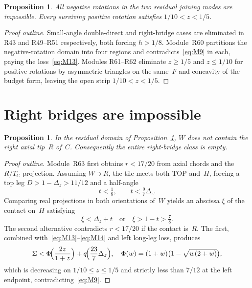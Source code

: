 \documentclass[11pt,reqno]{amsart}
\newtheorem{proposition}[theorem]{Proposition}
\theoremstyle{definition}
\newcommand{\TOP}{\mathrm{TOP}}
\begin{document}
\begin{proposition}\label{prop:M92}
All negative rotations in the two residual joining modes are impossible.
Every surviving positive rotation satisfies $1/10<z<1/5$.
\end{proposition}

\begin{proof}[Proof outline]
Small-angle double-direct and right-bridge cases are eliminated in R43 and
R49--R51 respectively, both forcing $h>1/8$.  Module~R60 partitions the
negative-rotation domain into four regions and contradicts~\eqref{eq:M9} in
each, paying the loss~\eqref{eq:M13}.  Modules R61--R62 eliminate
$z\ge 1/5$ and $z\le 1/10$ for positive rotations by asymmetric triangles on
the same~$F$ and concavity of the budget form, leaving the open strip
$1/10<z<1/5$.
\end{proof}

\section{Right bridges are impossible}\label{sec:M10}

\begin{proposition}\label{prop:M101}
In the residual domain of Proposition~\ref{prop:M92}, $W$ does not contain the
right axial tip~$R$ of~$C$.  Consequently the entire right-bridge class is
empty.
\end{proposition}

\begin{proof}[Proof outline]
Module~R63 first obtains $r<17/20$ from axial chords and the $R/T_C$
projection.  Assuming $W\ni R$, the tile meets both $\TOP$ and~$H$, forcing a
top leg $D>1-\Delta_z>11/12$ and a half-angle
\begin{equation}\label{eq:M14}
t<\tfrac18,\qquad t<\tfrac97\Delta_z.
\end{equation}
Comparing real projections in both orientations of~$W$ yields an abscissa
$\xi$ of the contact on~$H$ satisfying
\begin{equation}\label{eq:M15}
\xi<\Delta_z+t
\quad\text{or}\quad
\xi>1-t>\tfrac78.
\end{equation}
The second alternative contradicts $r<17/20$ if the contact is~$R$.  The first,
combined with~\eqref{eq:M13}--\eqref{eq:M14} and left long-leg loss, produces
\begin{equation}
\Sigma<\Phi\!\Bigl(\frac{2z}{1+z}\Bigr)+q\!\Bigl(\frac{23}{7}\Delta_z\Bigr),
\quad
\Phi(w)=(1+w)\bigl(1-\sqrt{w(2+w)}\bigr),
\end{equation}
which is decreasing on $1/10\le z\le 1/5$ and strictly less than $7/12$ at the
left endpoint, contradicting~\eqref{eq:M9}.
\end{proof}
\end{document}
